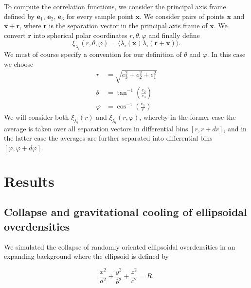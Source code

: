 \documentclass[a4paper,11pt]{article}
\begin{document}
To compute the correlation functions, we consider the principal axis frame defined by $\mathrm{\mathbf{e}}_1$, $\mathrm{\mathbf{e}}_2$, $\mathrm{\mathbf{e}}_3$ for every sample point $\mathrm{\mathbf{x}}$. We consider pairs of points $\mathrm{\mathbf{x}}$ and $\mathrm{\mathbf{x}}+\mathrm{\mathbf{r}}$, where $\mathrm{\mathbf{r}}$ is the separation vector in the principal axis frame of $\mathrm{\mathbf{x}}$. We convert $\mathrm{\mathbf{r}}$ into spherical polar coordinates $r, \theta, \varphi$ and finally define 
\begin{equation}
    \xi_{\lambda_i}(r, \theta, \varphi) = \langle\lambda_i(\mathrm{\mathbf{x}})\lambda_i(\mathrm{\mathbf{r+x}})\rangle.
\end{equation}
We must of course specify a convention for our definition of $\theta$ and $\varphi$. In this case we choose 
\begin{align}
    r &= \sqrt{e_3^2+e_2^2+e_1^2}\nonumber\\
    \theta &= \tan^{-1}\left(\frac{e_2}{e_3}\right)\nonumber\\
    \varphi &= \cos^{-1}\left(\frac{e_1}{r}\right)\nonumber
\end{align}
We will consider both $\xi_{\lambda_i}(r)$ and $\xi_{\lambda_i}(r,\varphi)$, whereby in the former case the average is taken over all separation vectors in differential bins $[r, r+dr]$, and in the latter case the averages are further separated into differential bins $[\varphi, \varphi + d\varphi]$.

\section{Results}\label{sec:results}

\subsection{Collapse and gravitational cooling of ellipsoidal overdensities}\label{sec:collapse}

We simulated the collapse of randomly oriented ellipsoidal overdensities in an expanding background where the ellipsoid is defined by

\begin{equation}
    \frac{x^2}{a^2}+\frac{y^2}{b^2}+\frac{z^2}{c^2} = R.
\end{equation}
\end{document}
